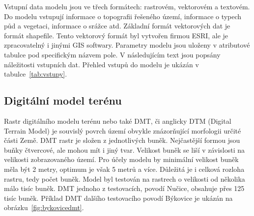 



Vstupní data modelu jsou ve třech formátech: rastrovém, vektorovém a textovém. Do modelu vstupují informace o topografii řešeného území, informace o typech půd a vegetaci, informace o srážce atd. Základní formát vektorových dat je formát shapefile. Tento vektorový formát byl vytvořen firmou ESRI, ale je zpracovatelný i jinými GIS softwary. Parametry modelu jsou uloženy v atributové tabulce pod specifickým názvem pole. 
V následujícím text jsou popsány náležitosti vstupních dat. 
% 
Přehled vstupů do modelu je ukázán v tabulce~\ref{tab:vstupy}.
% 





% 

















\subsection{Digitální model terénu} \label{sec:vstupdmt} 

Rastr digitálního modelu terénu nebo také DMT, či anglicky DTM (Digital Terrain Model) je souvislý povrch území obvykle znázorňující morfologii určité části Země. DMT rastr je složen z jednotlivých buněk. Nejčastější formou jsou buňky čtvercové, ale mohou mít i jiný tvar.  Velikost buněk se liší v závislosti na velikosti zobrazovaného území. Pro účely modelu \smod by minimální velikost buněk měla být 2 metry, optimum je však 5 metrů a více. Důležitá je i celková rozloha rastru, tedy počet buněk. Model byl testován na rastrech o velikosti od několika málo tisíc buněk. DMT jednoho z testovacích, povodí Nučice, obsahuje přes 125 tisíc buněk. Příklad DMT dalšího testovacího povodí Býkovice je ukázán na obrázku~\ref{fig:bykovicedmt}.


